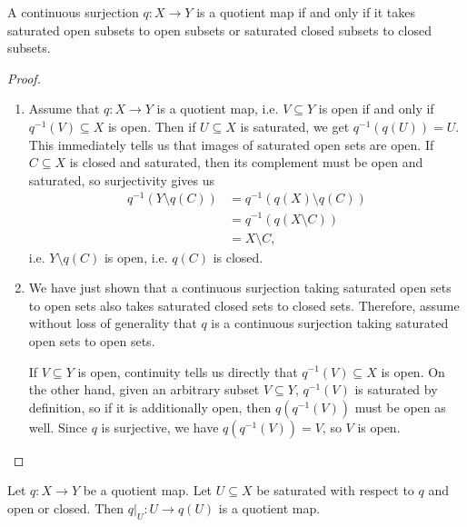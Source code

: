 \begin{theorem}
	A continuous surjection $q : X \to Y$ is a quotient map if and only if it takes saturated open subsets to open subsets or saturated closed subsets to closed subsets.
\end{theorem}
\begin{proof}
	\begin{enumerate}
		\item Assume that $q : X \to Y$ is a quotient map, i.e. $V \subseteq Y$ is open if and only if $q^{-1}(V) \subseteq X$ is open.
		\newpar
		Then if $U \subseteq X$ is saturated, we get $q^{-1}(q(U)) = U$. This immediately tells us that images of saturated open sets are open. If $C \subseteq X$ is closed and saturated, then its complement must be open and saturated, so surjectivity gives us
		\begin{align*}
			q^{-1}(Y \setminus q(C)) 
			&= q^{-1}(q(X) \setminus q(C))
			\\
			&= q^{-1}(q(X \setminus C))
			\\
			&= X \setminus C,
		\end{align*}
		i.e. $Y \setminus q(C)$ is open, i.e. $q(C)$ is closed.
		\item We have just shown that a continuous surjection taking saturated open sets to open sets also takes saturated closed sets to closed sets. Therefore, assume without loss of generality that $q$ is a continuous surjection taking saturated open sets to open sets.
		
		If $V \subseteq Y$ is open, continuity tells us directly that $q^{-1}(V) \subseteq X$ is open. On the other hand, given an arbitrary subset $V \subseteq Y$, $q^{-1}(V)$ is saturated by definition, so if it is additionally open, then $q(q^{-1}(V))$ must be open as well. Since $q$ is surjective, we have $q(q^{-1}(V)) = V$, so $V$ is open.
	\end{enumerate}
\end{proof}
\begin{theorem}
	\label{th:saturatedrestriction}
	Let $q : X \to Y$ be a quotient map. Let $U \subseteq X$ be saturated with respect to $q$ and open or closed. Then $q|_U : U \to q(U)$ is a quotient map.
\end{theorem}
